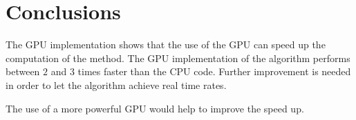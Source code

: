 \documentclass[oneside,a4paper,english,links]{article}
\begin{document}
\section{Conclusions}

The GPU implementation shows that the use of the GPU can speed up the computation of the method. The GPU implementation of the algorithm performs between $2$ and $3$ times faster than the CPU code. Further improvement is needed in order to let the algorithm achieve real time rates.

The use of a more powerful GPU would help to improve the speed up.




\end{document}
